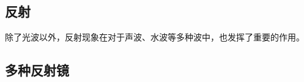 
\begin{issues}
\issueDraft
\issueMissDepend
\end{issues}

\subsection{反射}

除了光波以外，反射现象在对于声波、水波等多种波中，也发挥了重要的作用。
\subsection{多种反射镜}